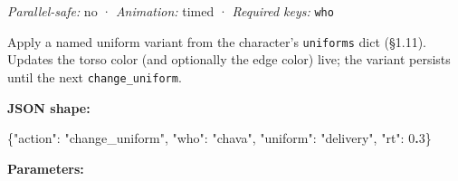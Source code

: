 \documentclass[
  12pt,
  letterpaper,
]{book}
\newenvironment{Shaded}{}{}
\newcommand{\DataTypeTok}[1]{\textcolor[rgb]{0.56,0.13,0.00}{#1}}
\newcommand{\DecValTok}[1]{\textcolor[rgb]{0.25,0.63,0.44}{#1}}
\newcommand{\ErrorTok}[1]{\textcolor[rgb]{1.00,0.00,0.00}{\textbf{#1}}}
\newcommand{\FunctionTok}[1]{\textcolor[rgb]{0.02,0.16,0.49}{#1}}
\newcommand{\StringTok}[1]{\textcolor[rgb]{0.25,0.44,0.63}{#1}}
\begin{document}
\emph{Parallel-safe:} no · \emph{Animation:} timed · \emph{Required
keys:} \texttt{who}

Apply a named uniform variant from the character's \texttt{uniforms}
dict (§1.11). Updates the torso color (and optionally the edge color)
live; the variant persists until the next \texttt{change\_uniform}.

\textbf{JSON shape:}

\begin{Shaded}
\begin{Highlighting}[]
\FunctionTok{\{}\DataTypeTok{"action"}\FunctionTok{:} \StringTok{"change\_uniform"}\FunctionTok{,} \DataTypeTok{"who"}\FunctionTok{:} \StringTok{"chava"}\FunctionTok{,} \DataTypeTok{"uniform"}\FunctionTok{:} \StringTok{"delivery"}\FunctionTok{,} \DataTypeTok{"rt"}\FunctionTok{:} \DecValTok{0}\ErrorTok{.}\DecValTok{3}\FunctionTok{\}}
\end{Highlighting}
\end{Shaded}

\textbf{Parameters:}
\end{document}
